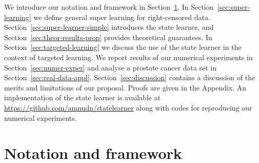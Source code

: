 We introduce our notation and framework in Section~\ref{sec:framework}. In
Section~\ref{sec:super-learning} we define general super learning for
right-censored data. Section~\ref{sec:super-learner-simple} introduces the state
learner, and Section~\ref{sec:theor-results-prop} provides theoretical
guarantees. In Section~\ref{sec:targeted-learning} we discuss the use of the
state learner in the context of targeted learning. We report results of our
numerical experiments in Section~\ref{sec:numer-exper} and analyse a prostate
cancer data set in Section~\ref{sec:real-data-appl}.
Section~\ref{sec:discussion} contains a discussion of the merits and limitations
of our proposal. Proofs are given in the Appendix. An implementation of the
state learner is available at \url{https://github.com/amnudn/statelearner} along
with codes for reproducing our numerical experiments.

\section{Notation and framework}
\label{sec:framework}

